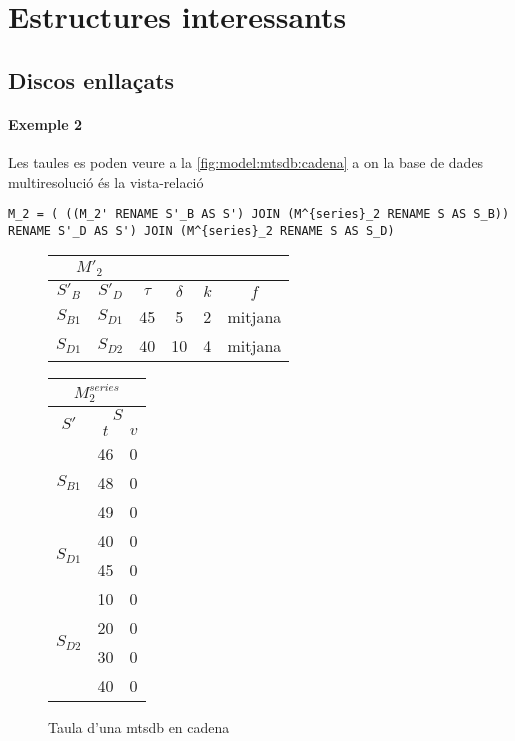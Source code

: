 \section{Estructures interessants}



\subsection{Discos enllaçats}



\paragraph{Exemple 2}

Les taules es poden veure a la \autoref{fig:model:mtsdb:cadena} a on la base de dades multiresolució és la vista-relació 
\begin{verbatim}
M_2 = ( ((M_2' RENAME S'_B AS S') JOIN (M^{series}_2 RENAME S AS S_B)) RENAME S'_D AS S') JOIN (M^{series}_2 RENAME S AS S_D)
\end{verbatim}



\begin{figure}[tp]
  \centering
  \begin{tabular}{|c|c|c|c|c|c|}
    \multicolumn{2}{c}{$M'_2$} \\ \hline
    $S'_B$  & $S'_D$ & $\tau$ & $\delta$ & $k$ & $f$ \\ \hline
    $S_{B1}$ & $S_{D1}$ & 45 & 5  & 2 & mitjana  \\
    $S_{D1}$ & $S_{D2}$ & 40 & 10 & 4 & mitjana  \\ \hline
  \end{tabular}\qquad
  \begin{tabular}{|c|c|c|}
    \multicolumn{3}{c}{$M^{series}_{2}$} \\ \hline
    \multirow{2}{*}{$S'$}  &  \multicolumn{2}{c|}{$S$} \\ \cline{2-3}
    & $t$      & $v$  \\ \hline
    \multirow{3}{*}{$S_{B1}$} & 46 & 0 \\ 
    & 48 & 0 \\ 
    & 49 & 0 \\ \hline
    \multirow{2}{*}{$S_{D1}$} & 40 & 0 \\ 
    & 45 & 0 \\ \hline
    \multirow{4}{*}{$S_{D2}$} & 10 & 0 \\ 
    & 20 & 0 \\ 
    & 30 & 0 \\ 
    & 40 & 0 \\ \hline
  \end{tabular}
  \caption{Taula d'una mtsdb en cadena}
  \label{fig:model:mtsdb:cadena}
\end{figure}

